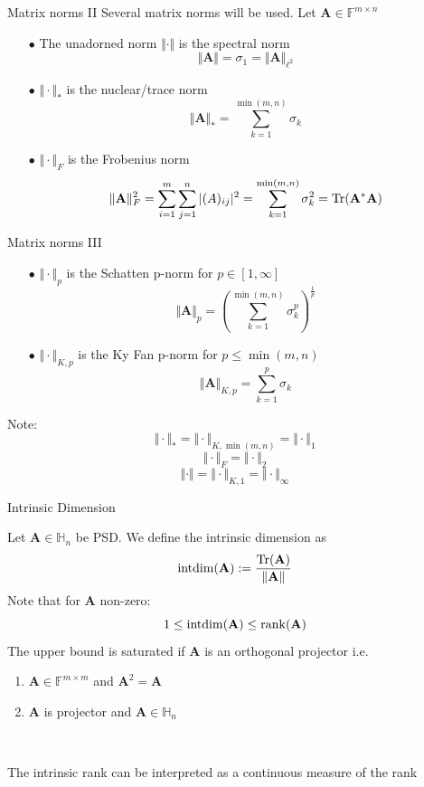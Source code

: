 \documentclass{beamer}
\newcommand{\bvec}[1]{\mathbf{#1}}
\newcommand{\vA}{\bvec{A}}
\begin{document}
\begin{frame}{Matrix norms II}
Several matrix norms will be used. Let $\vA \in \mathbb{F}^{m \times n}$
\begin{itemize}
    \item[$\bullet$] The unadorned norm $\Vert \cdot \Vert$ is the spectral norm
    $$
    \Vert \vA \Vert 
    =
    \sigma_1
    =
    \Vert \vA \Vert_{\ell^2} 
    $$
    \item[$\bullet$] $\Vert \cdot \Vert_*$ is the nuclear/trace norm
    $$
    \Vert \vA \Vert_*
    =
    \sum_{k=1}^{\min(m,n)} \sigma_k
    $$
    \item[$\bullet$] $\Vert \cdot \Vert_F$ is the Frobenius norm
    $$
    \Vert \vA \Vert_F^2
    =
    \sum_{i=1}^m\sum_{j=1}^n |(A)_{ij}|^2
    =
    \sum_{k=1}^{\min(m,n)} \sigma_k^2
    =
    {\rm Tr}(\vA^* \vA)
    $$
\end{itemize}
\end{frame}

\begin{frame}{Matrix norms III}

\begin{itemize}
    \item[$\bullet$] $\Vert \cdot \Vert_p$ is the Schatten p-norm for $p\in [1,\infty]$
    $$
    \Vert \vA \Vert_p
    =
    \left( 
    \sum_{k=1}^{\min(m,n)} \sigma_k^p
    \right)^{\frac{1}{p}}
    $$
    \item[$\bullet$] $\Vert \cdot \Vert_{K,p}$ is the Ky Fan p-norm for $p\leq \min(m,n)$
    $$
    \Vert \vA \Vert_{K,p}
    =
    \sum_{k=1}^{p} \sigma_k
    $$
\end{itemize}
Note:
$$
\Vert \cdot \Vert_*
=
\Vert \cdot \Vert_{K,\min(m,n)} 
=
\Vert \cdot \Vert_{1} 
$$
$$
\Vert \cdot \Vert_F
=
\Vert \cdot \Vert_2
$$
$$
\Vert \cdot \Vert 
= \Vert \cdot \Vert_{K,1}
= \Vert \cdot \Vert_{\infty}
$$
\end{frame}


\begin{frame}{Intrinsic Dimension}

Let $\vA\in\mathbb{H}_n$ be PSD. We define the intrinsic dimension as
$$
{\rm intdim}(\vA)
:=
\frac{{\rm Tr}(\vA)}{\Vert \vA \Vert}
$$
\pause
Note that for $\vA$ non-zero:
$$
1\leq {\rm intdim}(\vA) \leq {\rm rank} (\vA)
$$
The upper bound is saturated if $\vA$ is an orthogonal projector
\pause 
i.e.
\begin{enumerate}
    \item $\vA \in \mathbb{F}^{m\times m}$ and $\vA ^2 = \vA $
    \item $\vA$ is projector and $\vA \in \mathbb{H}_n$
\end{enumerate}
~\\
\begin{center}
The intrinsic rank can be interpreted as a continuous measure of the rank
\end{center}
    
\end{frame}
\end{document}
